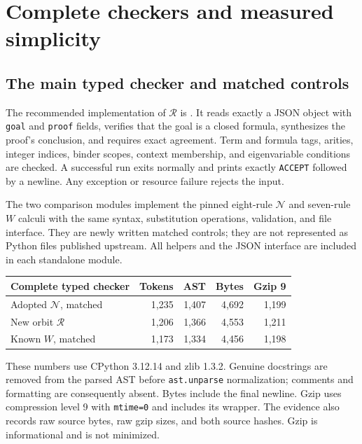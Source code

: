 \section{Complete checkers and measured simplicity}
\label{sec:comparison}

\subsection{The main typed checker and matched controls}

The recommended implementation of $\mathcal R$ is
. It reads exactly a JSON object with
\texttt{goal} and \texttt{proof} fields, verifies that the goal is a
closed formula, synthesizes the proof's conclusion, and requires exact
agreement. Term and formula tags, arities, integer indices, binder scopes,
context membership, and eigenvariable conditions are checked. A successful
run exits normally and prints exactly \texttt{ACCEPT} followed by a
newline. Any exception or resource failure rejects the input.

The two comparison modules implement the pinned eight-rule $\mathcal N$
and seven-rule $W$ calculi with the same syntax, substitution operations,
validation, and file interface. They are newly written matched controls;
they are not represented as Python files published upstream. All helpers
and the JSON interface are included in each standalone module.

\begin{center}
\small
\begin{tabular}{@{}lrrrr@{}}
\toprule
Complete typed checker & Tokens & AST & Bytes & Gzip 9 \\
\midrule
Adopted $\mathcal N$, matched & 1,235 & 1,407 & 4,692 & 1,199 \\
New orbit $\mathcal R$ & 1,206 & 1,366 & 4,553 & 1,211 \\
Known $W$, matched & 1,173 & 1,334 & 4,456 & 1,198 \\
\bottomrule
\end{tabular}
\end{center}

These numbers use CPython 3.12.14 and zlib 1.3.2. Genuine docstrings are
removed from the parsed AST before \texttt{ast.unparse} normalization;
comments and formatting are consequently absent. Bytes include the final
newline. Gzip uses compression level 9 with \texttt{mtime=0} and includes
its wrapper. The evidence also records raw source bytes, raw gzip sizes,
and both source hashes. Gzip is informational and is not minimized.

